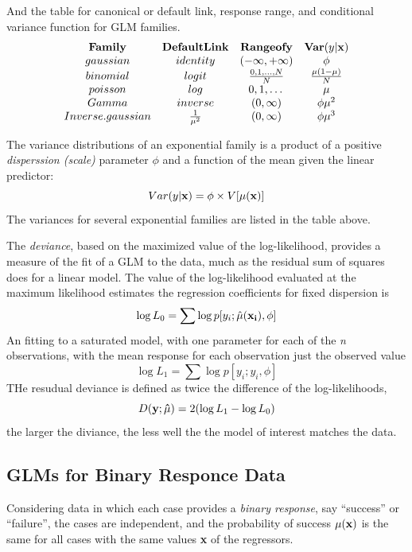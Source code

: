 \documentclass[
]{article}
\begin{document}
And the table for canonical or default link, response range, and
conditional variance function for GLM families. \[\begin{array}{cccc}
  \bf{Family} & {\bf Default Link} & {\bf Range of y}  & {\bf Var}(y|{\bf x}) \\
  gaussian & identity & (-\infty, +\infty) & \phi \\
  binomial & logit & \frac{0,1,\dots, N}{N} & \frac{\mu(1-\mu)}{N} \\
  poisson & log & 0,1,\dots & \mu \\
  Gamma & inverse & (0,\infty) & \phi \mu^2 \\
  Inverse.gaussian & \frac{1}{\mu^2} & (0,\infty) & \phi \mu^3
\end{array} \]

The variance distributions of an exponential family is a product of a
positive \emph{disperssion (scale)} parameter \(\phi\) and a function of
the mean given the linear predictor:
\[Var(y|{\bf x}) = \phi \times V[\mu({\bf x})]\] The variances for
several exponential families are listed in the table above.

The \emph{deviance}, based on the maximized value of the log-likelihood,
provides a measure of the fit of a GLM to the data, much as the residual
sum of squares does for a linear model. The value of the log-likelihood
evaluated at the maximum likelihood estimates the regression
coefficients for fixed dispersion is
\[ \log L_0 = \sum \log p[y_i;\hat \mu({\bf x_i}), \phi] \] An fitting
to a saturated model, with one parameter for each of the \emph{n}
observations, with the mean response for each observation just the
observed value \[ \log L_1 = \sum \log p[y_i; y_i , \phi] \] THe
resudual deviance is defined as twice the difference of the
log-likelihoods, \[D({\bf y; \hat \mu}) = 2(\log L_1 - \log L_0) \] the
larger the diviance, the less well the the model of interest matches the
data.

\hypertarget{glms-for-binary-responce-data}{%
\subsection{GLMs for Binary Responce
Data}\label{glms-for-binary-responce-data}}

Considering data in which each case provides a \emph{binary response},
say ``success'' or ``failure'', the cases are independent, and the
probability of success \(\mu({\bf x})\) is the same for all cases with
the same values \textbf{x} of the regressors.
\end{document}
